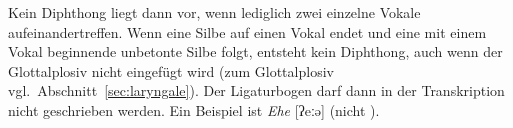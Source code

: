 \begin{exe}
  \ex\label{ex:vokaleunddiphthonge008}
  \begin{xlist}
  \end{xlist}
\end{exe}

Kein Diphthong liegt dann vor, wenn lediglich zwei einzelne Vokale aufeinandertreffen.
Wenn eine Silbe auf einen Vokal endet und eine mit einem Vokal beginnende unbetonte Silbe folgt, entsteht kein Diphthong, auch wenn der Glottalplosiv nicht eingefügt wird (zum Glottalplosiv vgl.\ Abschnitt~\ref{sec:laryngale}).
Der Ligaturbogen darf dann in der Transkription nicht geschrieben werden.
Ein Beispiel ist \textit{Ehe} [ʔeːə] (nicht \Ast[ʔe͡ə]).

\Stretch[3]

